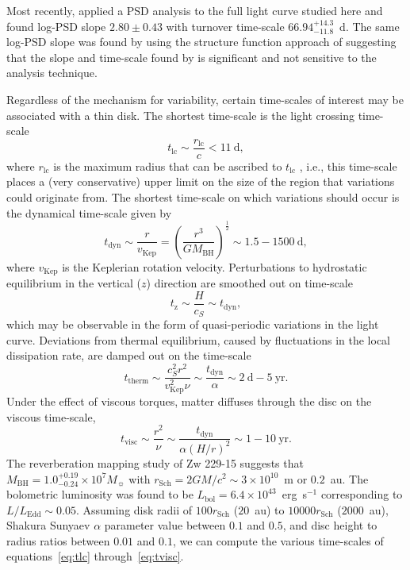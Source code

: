 \documentclass[a4paper,fleqn,usenatbib]{mnras}
\begin{document}
Most recently, \citet{CariniWilliamsAAS} applied a PSD analysis to the full light curve studied here and found log-PSD slope $2.80 \pm 0.43$ with turnover time-scale $66.94^{+14.3}_{-11.8}$~d. The same log-PSD slope was found by \citet{Kasliwal15b} using the structure function approach of \citet{Kasliwal15} suggesting that the slope and time-scale found by \citet{CariniWilliamsAAS} is significant and not sensitive to the analysis technique.

Regardless of the mechanism for variability, certain time-scales of interest may be associated with a thin disk. The shortest time-scale is the light crossing time-scale
\begin{equation}\label{eq:tlc}
t_{\mathrm{lc}} \sim \frac{r_{\mathrm{lc}}}{c} < 11~\text{d},
\end{equation}
where $r_{\mathrm{lc}}$ is the maximum radius that can be ascribed to $t_{\mathrm{lc}}$ \citep{Peterson}, i.e., this time-scale places a (very conservative) upper limit on the size of the region that variations could originate from. The shortest time-scale on which variations should occur is the dynamical time-scale given by
\begin{equation}\label{eq:tdyn}
t_{\mathrm{dyn}} \sim \frac{r}{v_{\mathrm{Kep}}} = \left( \frac{r^{3}}{GM_{\mathrm{BH}}} \right)^{\frac{1}{2}} \sim 1.5 - 1500~\text{d},
\end{equation}
where $v_{\mathrm{Kep}}$ is the Keplerian rotation velocity. Perturbations to hydrostatic equilibrium in the vertical ($z$) direction are smoothed out on time-scale
\begin{equation}\label{eq:tz}
t_{\mathrm{z}} \sim \frac{H}{c_{S}} \sim t_{\mathrm{dyn}},
\end{equation}
which may be observable in the form of quasi-periodic variations in the light curve. Deviations from thermal equilibrium, caused by fluctuations in the local dissipation rate, are damped out on the time-scale
\begin{equation}\label{eq:ttherm}
t_{\mathrm{therm}} \sim \frac{c_{S}^{2}r^{2}}{v_{\mathrm{Kep}}^{2} \nu} \sim \frac{t_{\mathrm{dyn}}}{\alpha}  \sim 2~\text{d} - 5~\text{yr}.
\end{equation}
Under the effect of viscous torques, matter diffuses through the disc on the viscous time-scale,
\begin{equation}\label{eq:tvisc}
t_{\mathrm{visc}} \sim \frac{r^{2}}{\nu} \sim \frac{t_{\mathrm{dyn}}}{\alpha (H/r)^{2}} \sim 1 - 10~\text{yr}.
\end{equation}
The \citet{Barth11} reverberation mapping study of Zw 229-15 suggests that $M_{\mathrm{BH}} = 1.0^{+0.19}_{-0.24} \times 10^{7} M_{\sun}$ with $r_{\mathrm{Sch}} = 2GM/c^{2} \sim 3 \times 10^{10}$~m or $0.2$~au. The bolometric luminosity was found to be $L_{\mathrm{bol}} = 6.4 \times 10^{43}$~erg~s$^{-1}$ corresponding to $L / L_{\mathrm{Edd}} \sim 0.05$. Assuming disk radii of $100 r_{\mathrm{Sch}}$ ($20$~au) to $10000 r_{\mathrm{{Sch}}}$ ($2000$~au), Shakura Sunyaev $\alpha$ parameter value between $0.1$ and $0.5$, and disc height to radius ratios between $0.01$ and $0.1$, we can compute the various time-scales of equations~\eqref{eq:tlc} through~\eqref{eq:tvisc}.
\end{document}
